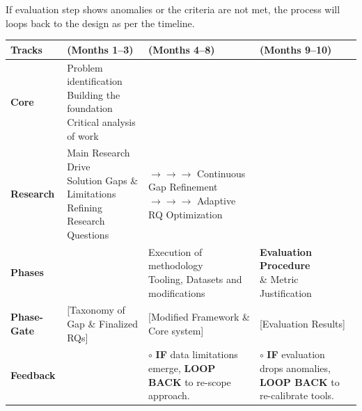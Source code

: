 \documentclass[a4paper, 12pt]{article}
\begin{document}
If evaluation step shows anomalies or the criteria are not met, the process will loops back to the design as per the timeline.





\begin{landscape}

 
\vspace{0.3em}
\renewcommand{\arraystretch}{1.15}
\setlength{\tabcolsep}{3pt}
\scriptsize
\begin{tabularx}{\linewidth}{|p{1.5cm}|X|X|X|}
\hline
\rowcolor{headerblue}
\textbf{Tracks} & \textbf{(Months 1--3)} & \textbf{(Months 4--8)} & \textbf{(Months 9--10)} \\
\hline
 
\textbf{Core} &
\makecell[l]{Problem identification \\ Building the foundation \\ Critical analysis of work} &
 & \\
\hline
 
\textbf{Research} &
\makecell[l]{Main Research Drive \\ Solution Gaps \& Limitations \\ Refining Research Questions} &
\makecell[l]{$\rightarrow\!\rightarrow\!\rightarrow$ Continuous Gap Refinement \\ $\rightarrow\!\rightarrow\!\rightarrow$ Adaptive RQ Optimization} &
\\
\hline
 
\textbf{Phases} &
 &
\makecell[l]{Execution of methodology \\ Tooling, Datasets and modifications} &
\makecell[l]{\textbf{Evaluation Procedure} \\ \& Metric Justification} \\
\hline
 
\rowcolor{lightblue}
\textbf{Phase-Gate} &
{[Taxonomy of Gap \& Finalized RQs]} &
{[Modified Framework \& Core system]} &
{[Evaluation Results]} \\
\hline
 
\textbf{Feedback} &
 &
\makecell[l]{$\circ$ \textbf{IF} data limitations emerge,\\ \textbf{LOOP BACK} to\\ re-scope approach.} &
\makecell[l]{$\circ$ \textbf{IF} evaluation drops anomalies,\\ \textbf{LOOP BACK} to\\ re-calibrate tools.} \\
\hline
 

\end{tabularx}
\end{landscape}
\end{document}
